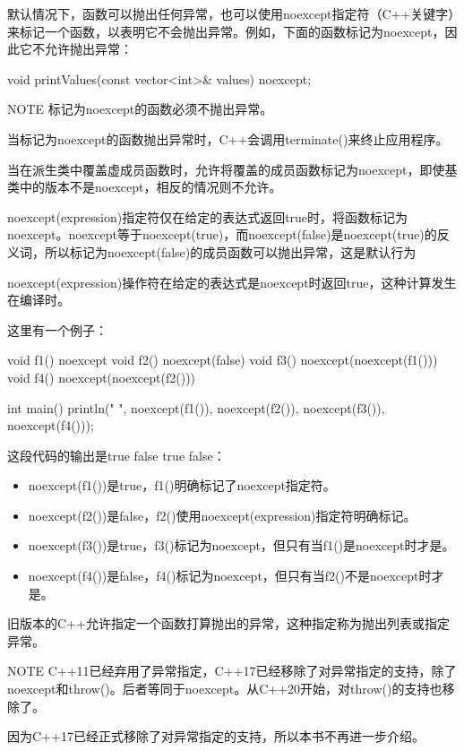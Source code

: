 默认情况下，函数可以抛出任何异常，也可以使用noexcept指定符（C++关键字）来标记一个函数，以表明它不会抛出异常。例如，下面的函数标记为noexcept，因此它不允许抛出异常：

\begin{cpp}
void printValues(const vector<int>& values) noexcept;
\end{cpp}

\begin{myNotic}{NOTE}
标记为noexcept的函数必须不抛出异常。
\end{myNotic}

当标记为noexcept的函数抛出异常时，C++会调用terminate()来终止应用程序。

当在派生类中覆盖虚成员函数时，允许将覆盖的成员函数标记为noexcept，即使基类中的版本不是noexcept，相反的情况则不允许。


noexcept(expression)指定符仅在给定的表达式返回true时，将函数标记为noexcept。noexcept等于noexcept(true)，而noexcept(false)是noexcept(true)的反义词，所以标记为noexcept(false)的成员函数可以抛出异常，这是默认行为


noexcept(expression)操作符在给定的表达式是noexcept时返回true，这种计算发生在编译时。

这里有一个例子：

\begin{cpp}
void f1() noexcept {}
void f2() noexcept(false) {}
void f3() noexcept(noexcept(f1())) {}
void f4() noexcept(noexcept(f2())) {}

int main()
{
    println("{} {} {} {}", noexcept(f1()),
                           noexcept(f2()),
                           noexcept(f3()),
                           noexcept(f4()));
}
\end{cpp}

这段代码的输出是true false true false：

\begin{itemize}
\item
noexcept(f1())是true，f1()明确标记了noexcept指定符。

\item
noexcept(f2())是false，f2()使用noexcept(expression)指定符明确标记。

\item
noexcept(f3())是true，f3()标记为noexcept，但只有当f1()是noexcept时才是。

\item
noexcept(f4())是false，f4()标记为noexcept，但只有当f2()不是noexcept时才是。
\end{itemize}


旧版本的C++允许指定一个函数打算抛出的异常，这种指定称为抛出列表或指定异常。

\begin{myNotic}{NOTE}
C++11已经弃用了异常指定，C++17已经移除了对异常指定的支持，除了noexcept和throw()。后者等同于noexcept。从C++20开始，对throw()的支持也移除了。
\end{myNotic}

因为C++17已经正式移除了对异常指定的支持，所以本书不再进一步介绍。

